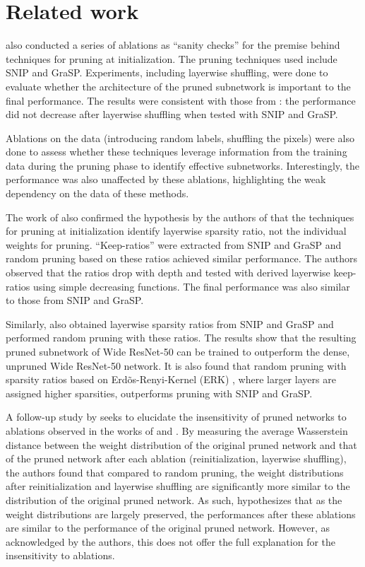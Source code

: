 
\chapter{Related work}
\label{ch:related}
\vspace{1em}

\textcite{su20} also conducted a series of ablations as ``sanity checks'' for the premise behind techniques for pruning at initialization. The pruning techniques used include SNIP and GraSP. Experiments, including layerwise shuffling, were done to evaluate whether the architecture of the pruned subnetwork is important to the final performance. The results were consistent with those from \textcite{frankle21}: the performance did not decrease after layerwise shuffling when tested with SNIP and GraSP.

Ablations on the data (introducing random labels, shuffling the pixels) were also done to assess whether these techniques leverage information from the training data during the pruning phase to identify effective subnetworks. Interestingly, the performance was also unaffected by these ablations, highlighting the weak dependency on the data of these methods.

The work of \textcite{su20} also confirmed the hypothesis by the authors of \textcite{frankle21} that  the techniques for pruning at initialization identify layerwise sparsity ratio, not the individual weights for pruning. ``Keep-ratios'' were extracted from SNIP and GraSP and random pruning based on these ratios achieved similar performance. The authors observed that the ratios drop with depth and tested with derived layerwise keep-ratios using simple decreasing functions. The final performance was also similar to those from SNIP and GraSP.

Similarly, \textcite{liu22} also obtained layerwise sparsity ratios from SNIP and GraSP and performed random pruning with these ratios. The results show that the resulting pruned subnetwork of Wide ResNet-50 can be trained to outperform the dense, unpruned Wide ResNet-50 network. It is also found that random pruning with sparsity ratios based on Erdõs-Renyi-Kernel (ERK) \autocite{evci21}, where larger layers are assigned higher sparsities, outperforms pruning with SNIP and GraSP.

A follow-up study by \textcite{singh21} seeks to elucidate the insensitivity of pruned networks to ablations observed in the works of \textcite{frankle21} and \textcite{su20}. By measuring the average Wasserstein distance between the weight distribution of the original pruned network and that of the pruned network after each ablation (reinitialization, layerwise shuffling), the authors found that compared to random pruning, the weight distributions after reinitialization and layerwise shuffling are significantly more similar to the distribution of the original pruned network. As such, \textcite{singh21} hypothesizes that as the weight distributions are largely preserved, the performances after these ablations are similar to the performance of the original pruned network. However, as acknowledged by the authors, this does not offer the full explanation for the insensitivity to ablations.

